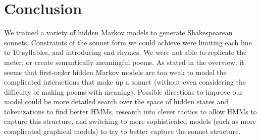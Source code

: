 \section{Conclusion}
\par We trained a variety of hidden Markov models to generate Shakespearean sonnets. Constraints of the sonnet form we could achieve were limiting each line to 10 syllables, and introducing end rhymes. We were not able to replicate the meter, or create semantically meaningful poems. As stated in the overview, it seems that first-order hidden Markov models are too weak to model the complicated interactions that make up a sonnet (without even considering the difficulty of making poems with meaning). Possible directions to improve our model could be more detailed search over the space of hidden states and tokenizations to find better HMMs, research into clever tactics to allow HMMs to capture this structure, and switching to more sophisticated models (such as more complicated graphical models) to try to better capture the sonnet structure.



